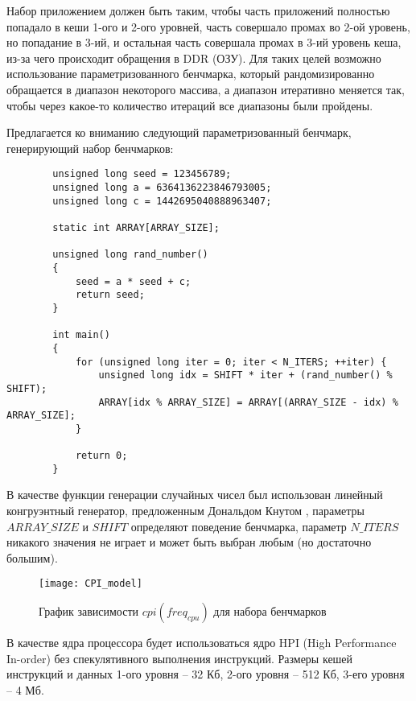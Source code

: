     Набор приложением должен быть таким, чтобы часть приложений полностью попадало в кеши 1-ого и 2-ого уровней,
    часть совершало промах во 2-ой уровень, но попадание в 3-ий, и остальная часть совершала промах в 3-ий уровень
    кеша, из-за чего происходит обращения в DDR (ОЗУ). Для таких целей возможно использование параметризованного
    бенчмарка, который рандомизированно обращается в диапазон некоторого массива, а диапазон итеративно меняется так,
    чтобы через какое-то количество итераций все диапазоны были пройдены.

    Предлагается ко вниманию следующий параметризованный бенчмарк, генерирующий набор бенчмарков:

    \begin{lstlisting}
        unsigned long seed = 123456789;
        unsigned long a = 6364136223846793005;
        unsigned long c = 1442695040888963407;

        static int ARRAY[ARRAY_SIZE];

        unsigned long rand_number()
        {
            seed = a * seed + c;
            return seed;
        }

        int main()
        {
            for (unsigned long iter = 0; iter < N_ITERS; ++iter) {
                unsigned long idx = SHIFT * iter + (rand_number() % SHIFT);
                ARRAY[idx % ARRAY_SIZE] = ARRAY[(ARRAY_SIZE - idx) % ARRAY_SIZE];
            }

            return 0;
        }
    \end{lstlisting}

    В качестве функции генерации случайных чисел был использован линейный конгруэнтный генератор,
    предложенным Дональдом Кнутом \cite{knuth1973art}, параметры $ARRAY\_SIZE$ и $SHIFT$ определяют
    поведение бенчмарка, параметр $N\_ITERS$ никакого значения не играет и может быть выбран любым
    (но достаточно большим).

    \begin{figure}[!h]
        \caption{График зависимости $cpi(freq_{cpu})$ для набора бенчмарков}
        \centering
        \texttt{[image: CPI\_model]}
        \label{pic:cpi_model}
    \end{figure}

    В качестве ядра процессора будет использоваться ядро HPI (High Performance In-order)
    \cite{gem52017HPI} без спекулятивного выполнения инструкций. Размеры кешей инструкций и данных
    1-ого уровня -- 32 Кб, 2-ого уровня -- 512 Кб, 3-его уровня -- 4 Мб.

